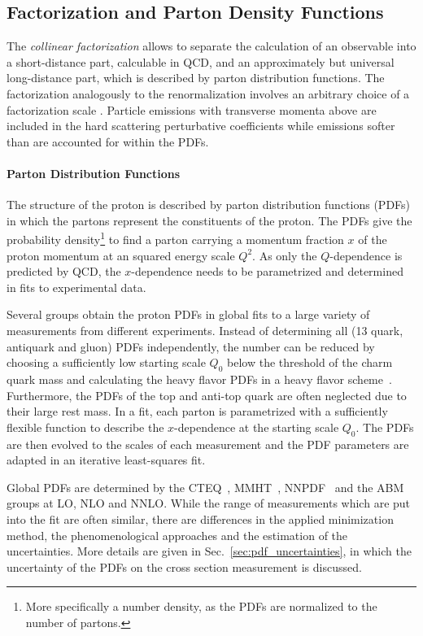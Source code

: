 \subsection{Factorization and Parton Density Functions}
\label{sec:factorization}

The \emph{collinear factorization} allows to separate the
calculation of an observable into a short-distance part, calculable in QCD, and
an approximately but universal long-distance part, which is described by parton
distribution functions. The factorization analogously to the renormalization
involves an arbitrary choice of a factorization scale \muf. Particle emissions
with transverse momenta above \muf are included in the hard scattering
perturbative coefficients while emissions softer than \muf are accounted for
within the PDFs.

\paragraph{Parton Distribution Functions}

The structure of the proton is described by parton distribution functions (PDFs)
in which the partons represent the constituents of the proton. The PDFs give
the probability density\footnote{More specifically a number density, as the PDFs are
normalized to the number of partons.} to find a parton carrying a momentum
fraction $x$ of the proton momentum at an squared energy scale $Q^2$. As only
the $Q$-dependence is predicted by QCD, the $x$-dependence needs to be
parametrized and determined in fits to experimental data.

Several groups obtain the proton PDFs in global fits to a large variety of
measurements from different experiments. Instead of determining all (13 quark,
antiquark and gluon) PDFs independently, the number can be reduced by choosing a
sufficiently low starting scale $Q_0$ below the threshold of the charm quark
mass and calculating the heavy flavor PDFs in a heavy flavor
scheme~\cite{Thorne:2006qt}. Furthermore, the PDFs of the top and anti-top quark
are often neglected due to their large rest mass. In a fit, each parton is
parametrized with a sufficiently flexible function to describe the
$x$-dependence at the starting scale $Q_0$. The PDFs are then evolved to the 
scales of each measurement and the PDF parameters are adapted in an iterative
least-squares fit.

Global PDFs are determined by the CTEQ~\cite{Dulat:2015mca},
MMHT~\cite{Harland-Lang:2014zoa}, NNPDF~\cite{Ball:2014uwa} and the
ABM~\cite{Alekhin:2013nda} groups at LO, NLO and NNLO. While the range of
measurements which are put into the fit are often similar, there are differences
in the applied minimization method, the phenomenological approaches and the
estimation of the uncertainties. More details are given in
Sec.~\ref{sec:pdf_uncertainties}, in which the uncertainty of the PDFs on the
cross section measurement is discussed.

